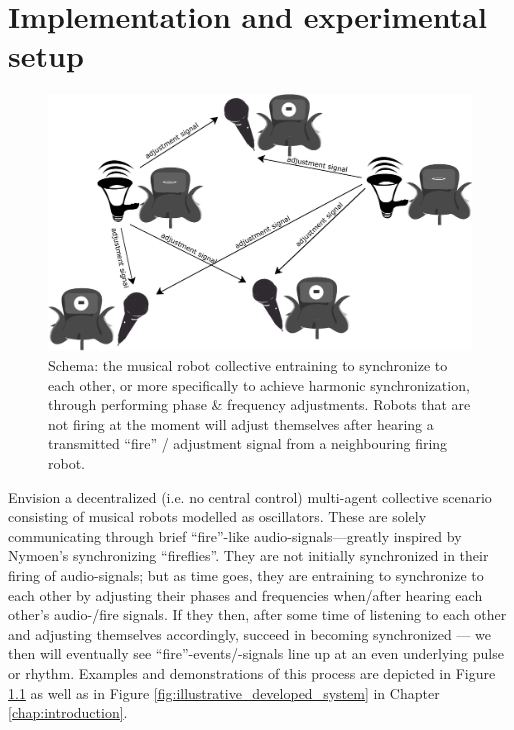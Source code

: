 \chapter{Implementation and experimental setup}
\label{chap:implementation}

\begin{figure}[h]
	\centering
	\includegraphics[width=0.9\linewidth]{Assets/DocSegments/Chapters/Implementation/Figures/Illustrations/schematic_initial_idea.pdf}
	\caption[Schema of the developed musical multi robot collective.]{Schema: the musical robot collective entraining to synchronize to each other, or more specifically to achieve harmonic synchronization, through performing phase \& frequency adjustments. Robots that are not firing at the moment will adjust themselves after hearing a transmitted ``fire'' / adjustment signal from a neighbouring firing robot.}
	\label{fig:first_idea:first_fig}
\end{figure}

Envision a decentralized (i.e. no central control) multi-agent collective scenario consisting of musical robots modelled as oscillators. These are solely communicating through brief ``fire''-like audio-signals—greatly inspired by Nymoen's synchronizing ``fireflies''. They are not initially synchronized in their firing of audio-signals; but as time goes, they are entraining to synchronize to each other by adjusting their phases and frequencies when/after hearing each other's audio-/fire signals. If they then, after some time of listening to each other and adjusting themselves accordingly, succeed in becoming synchronized — we then will eventually see ``fire''-events/-signals line up at an even underlying pulse or rhythm. Examples and demonstrations of this process are depicted in Figure \ref{fig:first_idea:first_fig} as well as in Figure \ref{fig:illustrative_developed_system} in Chapter \ref{chap:introduction}.

